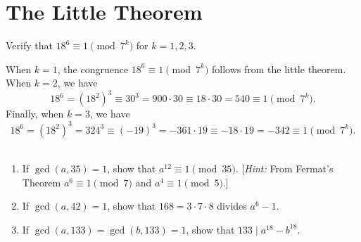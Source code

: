 \section{The Little Theorem}

\begin{exercise}
    Verify that $18^6 \equiv 1 \pmod{7^k}$ for $k = 1, 2, 3$. \\
\end{exercise}

\begin{solution}
    When $k = 1$, the congruence $18^6 \equiv 1 \pmod{7^k}$ follows from the little theorem. When $k = 2$, we have
    $$18^6 = (18^2)^3 \equiv 30^3 = 900\cdot 30 \equiv 18 \cdot 30 = 540 \equiv 1 \pmod{7^k}.$$
    Finally, when $k = 3$, we have 
    $$18^6 = (18^2)^3 = 324^3 \equiv (-19)^3 = - 361 \cdot 19 \equiv - 18 \cdot 19 = -342 \equiv 1 \pmod{7^k}.$$\\
\end{solution}

\begin{exercise}
    \begin{enumerate}
        \item If $\gcd(a, 35) = 1$, show that $a^{12} \equiv 1 \pmod{35}$. [\textit{Hint:} From Fermat's Theorem $a^6 \equiv 1 \pmod{7}$ and $a^4 \equiv 1 \pmod 5$.]
        \item If $\gcd(a, 42) = 1$, show that $168 = 3 \cdot 7 \cdot 8$ divides $a^6 - 1$.
        \item If $\gcd(a, 133) = \gcd(b, 133) = 1$, show that $133 \mid a^{18} - b^{18}$. 
    \end{enumerate}
\end{exercise}

